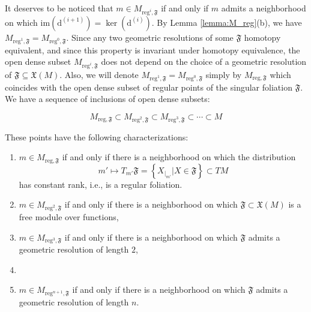 \documentclass[10pt]{article}
\theoremstyle{plain}
\theoremstyle{definition}
\theoremstyle{remark}
\newcommand{\dd}{\mathrm{d}}
\begin{document}
It deserves to be noticed that $m \in M_{\mathrm{reg}^i,\mathfrak{F}}$ if and only if $m$ admits a neighborhood on which $\mathrm{im}(\dd^{(i+1)})=\ker (\dd^{(i)})$. By Lemma \ref{lemma:M_reg}(b), we have $M_{\mathrm{reg}^1,\mathfrak F}=M_{\mathrm{reg}^0,\mathfrak F}$. Since any two geometric resolutions of some $\mathfrak F $ homotopy equivalent, and since this property is invariant under homotopy equivalence, the open dense subset $M_{\mathrm{reg}^i,\mathfrak{F}}$ does not depend on the choice of a geometric resolution of $\mathfrak F\subseteq \mathfrak X(M)$. Also, we will denote $M_{\mathrm{reg}^1, \mathfrak F}=M_{\mathrm{reg}^0,\mathfrak F}$ simply by $M_{\mathrm{reg}, \mathfrak F}$ which coincides with the open dense subset of regular points of the singular foliation $\mathfrak F$.  We have a sequence of inclusions of open dense subsets: 

$$   M_{\mathrm{reg},\mathfrak{F}} \subset M_{\mathrm{reg}^2,\mathfrak{F}}\subset M_{\mathrm{reg}^3,\mathfrak{F}}\subset \cdots \subset M$$

 These points have the following characterizations:
\begin{enumerate}
\item[$i=0,1$ :] $m \in M_{\mathrm{reg},\mathfrak{F}}$ if and only if there is a neighborhood on which the distribution $$m'\mapsto T_{m'} \mathfrak F =\left\{ X_{|_{m'}} | X \in \mathfrak F\right\}\subset TM$$ has constant rank, i.e., is a regular foliation.
\item[$i=2$ :] $ m \in M_{\mathrm{reg}^2,\mathfrak{F}}$ if and only if there is a neighborhood on which $ \mathfrak F\subset \mathfrak X(M)$ is a free module over functions,
\item[$i=3$ :]  $ m \in M_{\mathrm{reg}^3,\mathfrak{F}}$ if and only if there is a neighborhood on which $ \mathfrak F$ admits a geometric resolution of length $2$,
\item[$ \vdots$\, \,]  
\item[$i=n+1 $ : ]  $ m \in M_{\mathrm{reg}^{n+1}, \mathfrak F}$ if and only if there is a neighborhood on which $ \mathfrak F$ admits a geometric resolution of length $n$.
\end{enumerate}
 

\end{document}
